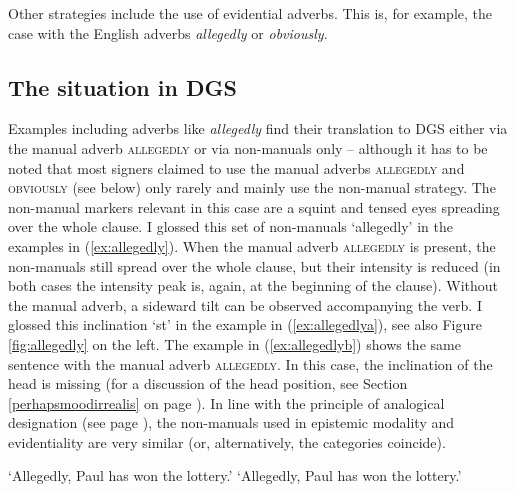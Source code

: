 \noindent Other strategies include the use of evidential adverbs. This is, for example, the case with the English adverbs \textit{allegedly} or \textit{obviously}. 

\subsection{The situation in DGS}
Examples including adverbs like \textit{allegedly} find their translation to DGS either via the manual adverb \textsc{allegedly} or via non-manuals only -- although it has to be noted that most signers claimed to use the manual adverbs \textsc{allegedly} and \textsc{obviously} (see below) only rarely and mainly use the non-manual strategy. The non-manual markers relevant in this case are a squint and tensed eyes spreading over the whole clause. I glossed this set of non-manuals `allegedly' in the examples in (\ref{ex:allegedly}). When the manual adverb \textsc{allegedly} is present, the non-manuals still spread over the whole clause, but their intensity is reduced (in both cases the intensity peak is, again, at the beginning of the clause). Without the manual adverb, a sideward tilt can be observed accompanying the verb. I glossed this inclination `st' in the example in (\ref{ex:allegedlya}), see also Figure \ref{fig:allegedly} on the left. The example in (\ref{ex:allegedlyb}) shows the same sentence with the manual adverb \textsc{allegedly}. In this case, the inclination of the head is missing (for a discussion of the head position, see Section \ref{perhapsmoodirrealis} on page \pageref{perhapsmoodirrealis}). In line with the principle of analogical designation (see page \pageref{analogicaldesignation}), the non-manuals used in epistemic modality and evidentiality are very similar (or, alternatively, the categories coincide).

\begin{exe}
\ex\begin{xlist}\label{ex:allegedly}
\ex\label{ex:allegedlyb} 
\glt `Allegedly, Paul has won the lottery.'
\ex\label{ex:allegedlya}  
\glt `Allegedly, Paul has won the lottery.'
\end{xlist}
\end{exe}

